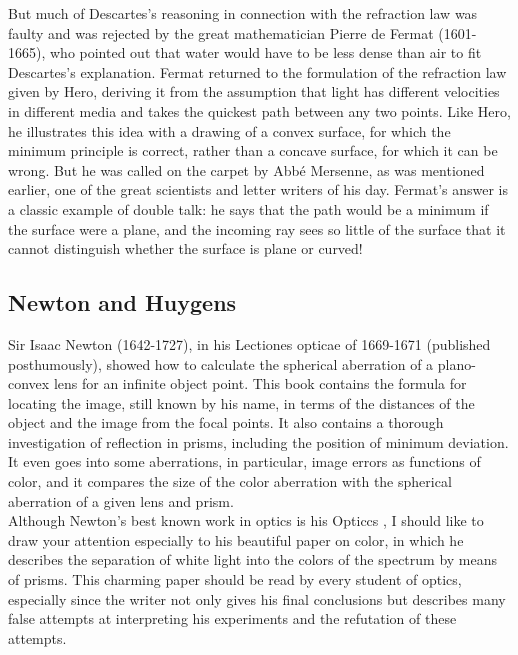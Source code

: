             But much of Descartes's reasoning in connection with the refraction law was faulty and was rejected by the great mathematician Pierre de Fermat (1601-1665), who pointed out that water would have to be less dense than air to fit Descartes's explanation. Fermat returned to the formulation of the refraction law given by Hero, deriving it from the assumption that light has different velocities in different media and takes the quickest path between any two points. Like Hero, he illustrates this idea with a drawing of a convex surface, for which the minimum principle is correct, rather than a concave surface, for which it can be wrong. But he was called on the carpet by Abbé Mersenne, as was mentioned earlier, one of the great scientists and letter writers of his day. Fermat's answer is a classic example of double talk: he says that the path would be a minimum if the surface were a plane, and the incoming ray sees so little of the surface that it cannot distinguish whether the surface is plane or curved!

        \subsection{Newton and Huygens}

            Sir Isaac Newton (1642-1727), in his Lectiones opticae of 1669-1671 (published posthumously), showed how to calculate the spherical aberration of a plano-convex lens for an infinite object point. This book contains the formula for locating the image, still known by his name, in terms of the distances of the object and the image from the focal points. It also contains a thorough investigation of reflection in prisms, including the position of minimum deviation. It even goes into some aberrations, in particular, image errors as functions of color, and it compares the size of the color aberration with the spherical aberration of a given lens and prism.\\

            Although Newton's best known work in optics is his Opticcs , I should like to draw your attention especially to his beautiful paper on color, in which he describes the separation of white light into the colors of the spectrum by means of prisms. This charming paper should be read by every student of optics, especially since the writer not only gives his final conclusions but describes many false attempts at interpreting his experiments and the refutation of these attempts.\\

